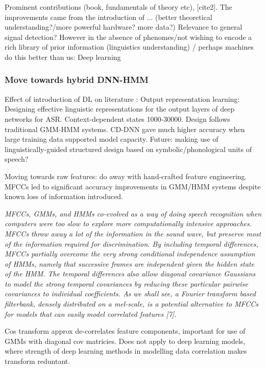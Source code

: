 \documentclass[12pt]{llncs}
\begin{document}
Prominent contributions \cite{rabiner1993fundamentals} (book, fundamentals of theory etc), [cite2]. The improvements came from the introduction of ... (better theoretical understanding?/more powerful hardware? more data?)
Relevance to general signal detection? However in the absence of phenomes/not wishing to encode a rich library of prior information (linguistics understanding) / perhaps machines do this better than us: Deep learning


\subsubsection{Move towards hybrid DNN-HMM}


Effect of introduction of DL on literature \cite{deng2014achievements}:
Output representation learning:
Designing effective linguistic representations for the output layers of deep networks for ASR. Context-dependent states 1000-30000. Design follows traditional GMM-HMM systems. CD-DNN gave much higher accuracy when large training data supported model capacity. Future: making use of linguistically-guided structured design based on symbolic/phonological units of speech?

Moving towards raw features:
do away with hand-crafted feature engineering. MFCCs led to significant accuracy improvements in GMM/HMM systems despite known loss of information introduced.

\emph{MFCCs, GMMs, and HMMs co-evolved as a way of doing
speech recognition when computers were too slow to explore
more computationally intensive approaches. MFCCs throw
away a lot of the information in the sound wave, but preserve
most of the information required for discrimination. By including
temporal differences, MFCCs partially overcome the
very strong conditional independence assumption of HMMs,
namely that successive frames are independent given the
hidden state of the HMM. The temporal differences also allow
diagonal covariance Gaussians to model the strong temporal
covariances by reducing these particular pairwise covariances
to individual coefficients. As we shall see, a Fourier transform
based filterbank, densely distributed on a mel-scale, is a potential
alternative to MFCCs for models that can easily model
correlated features [7]. \cite{mohamed2012acoustic}}



 Cos transform approx de-correlates feature components, important for use of GMMs with diagonal cov matricies. Does not apply to deep learning models, where strength of deep learning methods in modelling data correlation makes transform reduntant.
\end{document}
